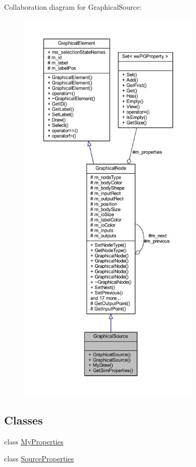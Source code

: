 Collaboration diagram for Graphical\+Source\+:
\nopagebreak
\begin{figure}[H]
\begin{center}
\leavevmode
\includegraphics[height=550pt]{class_graphical_source__coll__graph}
\end{center}
\end{figure}
\subsection*{Classes}
\begin{DoxyCompactItemize}
\item 
class \hyperlink{class_graphical_source_1_1_my_properties}{My\+Properties}
\item 
class \hyperlink{class_graphical_source_1_1_source_properties}{Source\+Properties}
\end{DoxyCompactItemize}
